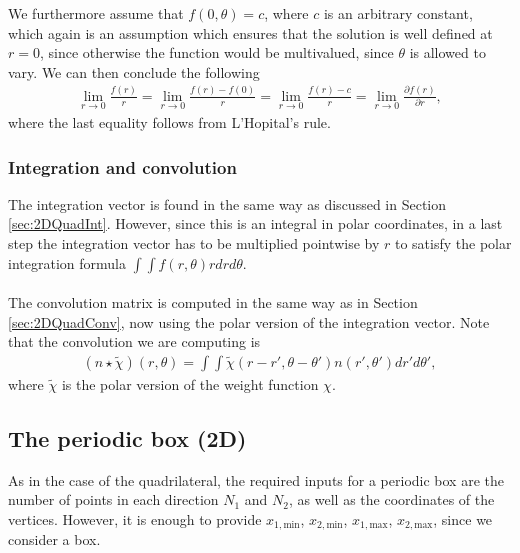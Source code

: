 We furthermore assume that $f(0, \theta)=c$, where $c$ is an arbitrary constant, which again is an assumption which ensures that the solution is well defined at $r=0$, since otherwise the function would be multivalued, since $\theta$ is allowed to vary.
We can then conclude the following
\begin{align*}
	\lim_{r \to 0}\frac{f(r)}{r} = \lim_{r \to 0} \frac{f(r) - f(0)}{r} = \lim_{r \to 0} \frac{f(r) - c}{r} = \lim_{r \to 0} \frac{\partial f(r)}{\partial r},
\end{align*}
where the last equality follows from L'Hopital's rule.
\subsubsection{Integration and convolution}
The integration vector is found in the same way as discussed in Section \ref{sec:2DQuadInt}. However, since this is an integral in polar coordinates, in a last step the integration vector has to be multiplied pointwise by $r$ to satisfy the polar integration formula $\int \int f(r, \theta) r dr d\theta$.
\\
\\
The convolution matrix is computed in the same way as in Section \ref{sec:2DQuadConv}, now using the polar version of the integration vector. 
Note that the convolution we are computing is
\begin{align*}
	\left(n \star \tilde \chi \right) (r, \theta) = \int \int \tilde \chi (r - r', \theta - \theta') n (r',\theta') d r' d\theta',
\end{align*}
where $\tilde \chi$ is the polar version of the weight function $\chi$.
\subsection{The periodic box (2D)}
As in the case of the quadrilateral, the required inputs for a periodic box are the number of points in each direction $N_1$ and $N_2$, as well as the coordinates of the vertices. However, it is enough to provide $x_{1,\text{min}}$, $x_{2,\text{min}}$, $x_{1,\text{max}}$, $x_{2,\text{max}}$, since we consider a box.

